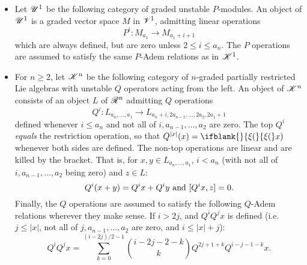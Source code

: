 \documentclass[11pt]{article}
\newcommand{\GoodLie}[1]{\mathsf{g}{\scrL}^{#1}}%
\newcommand{\PRLie}[1]{\scrR^{#1}}%
\newcommand{\LL}[1]{{\scrK}^{#1}}%
\newcommand{\GR}[1]{\scrV^{#1}}%
\newcommand{\nontop}[1]{\scrU^{#1}}%
\newcommand{\restn}[2][]{\ifblank{#1}{\xi{#2}}{\xi_{#1}{#2}}}%
\renewcommand{\Q}{Q}
\begin{document}
\begin{CategoriesOfInterest}
\begin{itemize}
\item Let $\nontop{1}$ be the following category of graded unstable $P$-modules. An object of $\nontop{1}$ is a graded vector space $M$ in $\GR{1}$,
admitting linear operations
\[P^i:M_{a_1}\to M_{a_1+i+1}\]
which are always defined, but are zero unless $2\leq i\leq a_n$.
The $P$ operations are assumed to satisfy the same $P$-Adem relations as in $\LL{1}$. %
\item For $n\geq2$, let $\LL{n}$ be the following category of $n$-graded partially restricted Lie algebras with unstable $\Q$ operators acting from the left. An object of $\LL{n}$ consists of an object $L$ of $\PRLie{n}$ 
admitting $\Q$ operations
\[\Q^i:L_{a_n,\ldots,a_1}\to L_{a_n+i,2a_{n-1},\ldots,2a_2,2a_1+1}\]
defined whenever $i\leq a_n$ and not all of $i,a_{n-1},\ldots,a_{2}$ are zero. The top $\Q^i$ \emph{equals} the restriction operation, so that $\Q^{|x|}(x)=\restn(x)$ whenever both sides are defined. The non-top operations are linear and are killed by the bracket.
That is, for $x,y\in L_{a_n,\ldots,a_1}$, $i<a_n$ (with not all of $i,a_{n-1},\ldots,a_{2}$ being zero) and $z\in L$: \[\Q^i{(x+y)}=\Q^i{x}+\Q^i{y}\textup{ and }[\Q^i{x},z]=0.\]
Finally, the $\Q$ operations are assumed to satisfy the following $\Q$-Adem relations wherever they make sense. If $i>2j$, and $\Q^i\Q^jx$ is defined (i.e.\ $j\leq|x|$, not all of $j,a_{n-1},\ldots,a_2$ are zero, and $i\leq|x|+j$):
\[\Q^i\Q^jx=\sum_{k=0}^{(i-2j)/2-1}{i-2j-2-k\choose k}\Q^{2j+1+k}\Q^{i-j-1-k}x.\]

\end{itemize}
\end{CategoriesOfInterest}
\end{document}
